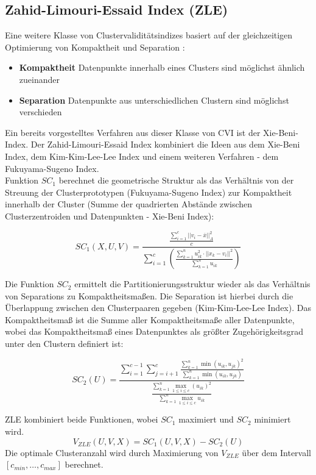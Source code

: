 \documentclass[11pt,ceqn]{book}
\begin{document}
\subsection{Zahid-Limouri-Essaid Index (ZLE)}
Eine weitere Klasse von Clustervaliditätsindizes basiert auf der gleichzeitigen Optimierung von Kompaktheit und Separation \cite{zle}:
\begin{itemize}
\item \textbf{Kompaktheit} Datenpunkte innerhalb eines Clusters sind möglichst ähnlich zueinander
\item \textbf{Separation} Datenpunkte aus unterschiedlichen Clustern sind möglichst verschieden
\end{itemize}

Ein bereits vorgestelltes Verfahren aus dieser Klasse von CVI ist der Xie-Beni-Index. Der Zahid-Limouri-Essaid Index kombiniert die Ideen aus dem Xie-Beni Index, dem Kim-Kim-Lee-Lee Index und einem weiteren Verfahren - dem Fukuyama-Sugeno Index. \\

Funktion $SC_1$ berechnet die geometrische Struktur als das Verhältnis von der Streuung der Clusterprototypen (Fukuyama-Sugeno Index) zur Kompaktheit innerhalb der Cluster (Summe der quadrierten Abstände zwischen Clusterzentroiden und Datenpunkten - Xie-Beni Index):

$$SC_1(X,U,V) = \frac{\frac{\sum\limits_{i=1}^c ||v_i-\overline{x}||_A^2}{c}}{\sum\limits_{i=1}^c\left(\frac{\sum\limits_{k=1}^n u_{ik}^2 \cdot ||x_k-v_i||^2}{\sum\limits_{k=1}^n u_{ik}}\right)}$$

Die Funktion $SC_2$ ermittelt die Partitionierungsstruktur wieder als das Verhältnis von Separations zu Kompaktheitsmaßen. Die Separation ist hierbei durch die Überlappung zwischen den Clusterpaaren gegeben (Kim-Kim-Lee-Lee Index). Das Kompaktheitsmaß ist die Summe aller Kompaktheitsmaße aller Datenpunkte, wobei das Kompaktheitsmaß eines Datenpunktes als größter Zugehörigkeitsgrad unter den Clustern definiert ist: 

$$SC_2(U) = \frac{\sum\limits_{i=1}^{c-1} \sum\limits_{j=i+1}^c\frac{\sum\limits_{k=1}^n \min(u_{ik},u_{jk})^2}{\sum\limits_{k=1}^n \min(u_{ik},u_{jk})}}{\frac{\sum\limits_{k=1}^n \max_{1\leqslant i \leqslant c}(u_{ik})^2}{\sum\limits_{k=1}^n \max_{1\leqslant i \leqslant c}u_{ik}}}$$ 

ZLE kombiniert beide Funktionen, wobei $SC_1$ maximiert und $SC_2$ minimiert wird.
$$V_{ZLE}(U,V,X) = SC_1(U,V,X)-SC_2(U)$$
Die optimale Clusteranzahl wird durch Maximierung von
$V_{ZLE}$ über dem Intervall $\left[c_{min},\dots,c_{max}\right]$ berechnet.
\end{document}

